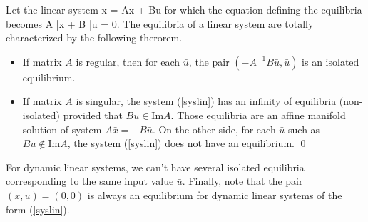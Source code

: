 Let the linear system
\eqnn
\dot x = Ax + Bu \label{syslin}
\eeqnn
for which the equation defining the equilibria becomes
\eqnn A \bar x + B \bar u = 0. \eeqnn
The equilibria of a linear system are totally 
characterized by the following therorem.

\begin{theoreme}{\blanc}
\begin{itemize}
\item  If matrix $A$ is regular, then for each $\bar u$, the pair
$(-A^{-1}B\bar u,\bar u)$ is an isolated equilibrium.
\item If matrix $A$ is singular, the system
(\ref{syslin}) has an infinity of equilibria (non-isolated) 
provided that $B\bar u \in \mbox{Im}A$. Those equilibria are an 
affine manifold solution of system $A \bar x = -B \bar u$. On
the other side, for each $\bar u$ such as $B\bar u \notin \mbox{Im}A$, the 
system (\ref{syslin}) does not have an equilibrium. \qed
\end{itemize}
\end{theoreme}

For dynamic linear systems, we can't have several isolated equilibria corresponding 
to the same input value $\bar u$. 
Finally, note that the pair $(\bar x, \bar u) = (0,0)$ is always an equilibrium 
for dynamic linear systems of the form (\ref{syslin}).

